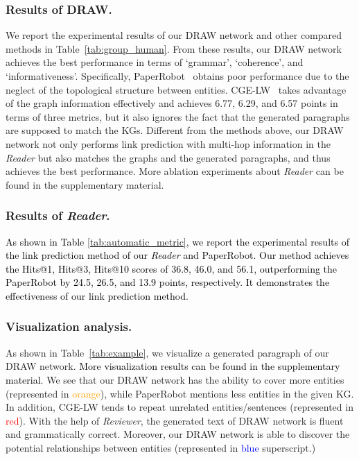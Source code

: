 \documentclass[letterpaper]{article}
\def\hmg{\textcolor{black}}
\begin{document}
\subsubsection{Results of DRAW.}
We report the experimental results of our DRAW network and other compared methods in Table~\ref{tab:group_human}. 
From these results, our DRAW network achieves the best performance in terms of `grammar', `coherence', and `informativeness'. 
Specifically, 
PaperRobot~\cite{Wang2019PaperRobotID} obtains poor performance due to the neglect of the topological structure between entities.
CGE-LW~\cite{ribeiro2020modeling} takes advantage of the graph information effectively and achieves 6.77, 6.29, and 6.57 points in terms of three metrics, but it also ignores the fact that the generated paragraphs are supposed to match the KGs.
Different from the methods above, our DRAW network not only performs link prediction with multi-hop information in the \textit{Reader} but also matches the graphs and the generated paragraphs, and thus achieves the best performance. 
More ablation experiments about \textit{Reader} can be found in the supplementary material.

\subsubsection{Results of \textit{Reader}.}
\hmg{
As shown in Table \ref{tab:automatic_metric}, we report the experimental results of the link prediction method of our \textit{Reader} and PaperRobot. Our method achieves the Hits@1, Hits@3, Hits@10 scores of 36.8, 46.0, and 56.1, outperforming the PaperRobot by 24.5, 26.5, and 13.9 points, respectively. 
It demonstrates the effectiveness of our link prediction method.
}

\subsubsection{Visualization analysis.}

As shown in Table~\ref{tab:example}, we visualize a generated paragraph of our DRAW network. 
\hmg{More visualization results can be found in the supplementary material.}
We see that our DRAW network has the ability to cover more entities (represented in \textcolor{orange}{orange}), while PaperRobot  mentions less entities in the given KG. In addition, CGE-LW tends to repeat unrelated entities/sentences (represented in \textcolor{red}{red}).
With the help of \textit{Reviewer}, the generated text of DRAW network is fluent and grammatically correct. Moreover, our DRAW network is able to discover the potential relationships between entities (represented in \textcolor{blue}{blue} superscript.)
\end{document}
